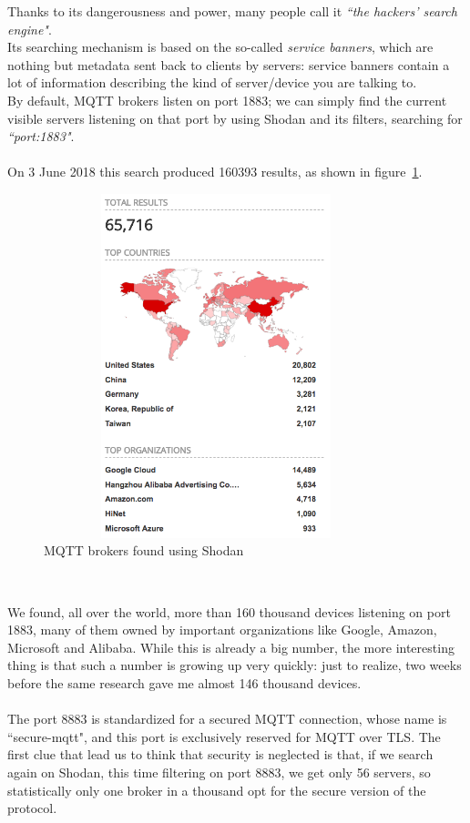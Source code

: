 \documentclass[12pt]{report}
\begin{document}
{{Thanks to its dangerousness and power, many people call it \emph{``the hackers' search engine"}.\\
Its searching mechanism is based on the so-called \emph{service banners}, which are nothing but metadata sent back to clients by servers: service banners contain a lot of information describing the kind of server/device you are talking to.\\

By default, MQTT brokers listen on port 1883; we can simply find the current visible servers listening on that port by using Shodan and its filters, searching for \emph{``port:1883"}.\\\\
On 3 June 2018 this search produced 160393 results, as shown in figure~\ref{fig:shodanres}.\\

\begin{figure}[H]
\includegraphics[width=10cm,height=10cm,keepaspectratio]{shodan_numdevices}
\centering
\caption{MQTT brokers found using Shodan}
\label{fig:shodanres}
\end{figure}\

We found, all over the world, more than 160 thousand devices listening on port 1883, many of them owned by important organizations like Google, Amazon, Microsoft and Alibaba.
While this is already a big number, the more interesting thing is that such a number is growing up very quickly: just to realize, two weeks before the same research gave me almost 146 thousand devices.\\\\
The port 8883 is standardized for a secured MQTT connection, whose name is ``secure-mqtt", and this port is exclusively reserved for MQTT over TLS.
The first clue that lead us to think that security is neglected is that, if we search again on Shodan, this time filtering on port 8883, we get only 56 servers, so statistically only one broker in a thousand opt for the secure version of the protocol.

}}
\end{document}
